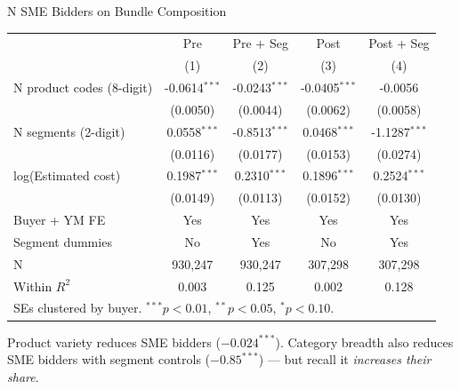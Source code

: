 \documentclass[9pt,aspectratio=169]{beamer}
\begin{document}
\begin{frame}{N SME Bidders on Bundle Composition}
\centering\small
\begin{tabular}{lcccc}
\toprule
 & Pre & Pre + Seg & Post & Post + Seg \\
 & (1) & (2) & (3) & (4) \\
\midrule
N product codes (8-digit) & -0.0614$^{***}$ & -0.0243$^{***}$ & -0.0405$^{***}$ & -0.0056 \\
 & (0.0050) & (0.0044) & (0.0062) & (0.0058) \\[2pt]
N segments (2-digit) & 0.0558$^{***}$ & -0.8513$^{***}$ & 0.0468$^{***}$ & -1.1287$^{***}$ \\
 & (0.0116) & (0.0177) & (0.0153) & (0.0274) \\[2pt]
log(Estimated cost) & 0.1987$^{***}$ & 0.2310$^{***}$ & 0.1896$^{***}$ & 0.2524$^{***}$ \\
 & (0.0149) & (0.0113) & (0.0152) & (0.0130) \\[2pt]
\midrule
Buyer + YM FE & Yes & Yes & Yes & Yes \\
Segment dummies & No & Yes & No & Yes \\
N & 930,247 & 930,247 & 307,298 & 307,298 \\
Within $R^2$ & 0.003 & 0.125 & 0.002 & 0.128 \\
\bottomrule
\multicolumn{5}{l}{\footnotesize SEs clustered by buyer. $^{***}p<0.01$, $^{**}p<0.05$, $^{*}p<0.10$.} \\
\end{tabular}

\medskip
\small Product variety reduces SME bidders ($-0.024^{***}$). Category breadth also reduces SME bidders with segment controls ($-0.85^{***}$) --- but recall it \textit{increases their share}.
\end{frame}
\end{document}

